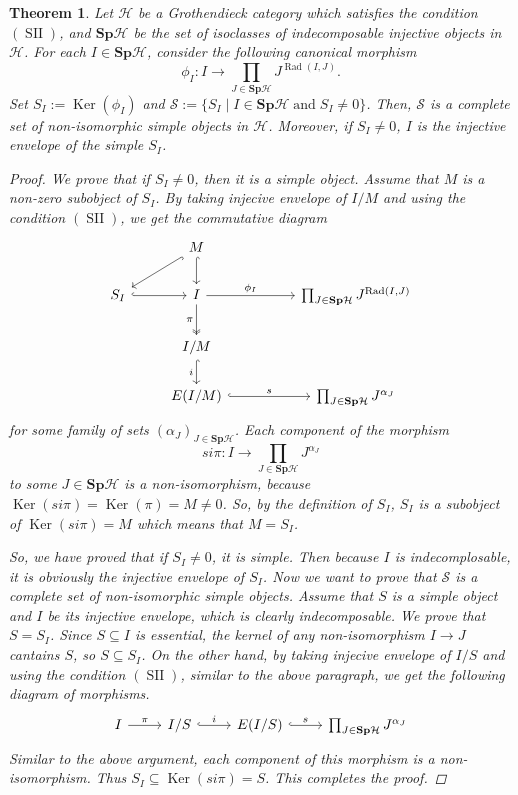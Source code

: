 \documentclass[12pt]{amsart}
\numberwithin{equation}{section}
\newtheorem{theorem}[lemma]{Theorem}
\theoremstyle{definition}
\DeclareMathOperator{\Ker}{Ker}
\DeclareMathOperator{\SII}{SII}
\DeclareMathOperator{\Rad}{Rad}
\newtheorem*{theorem 0*}{Theorem}
\newtheorem*{theorem a*}{Theorem A}
\newtheorem*{theorem b*}{Theorem B}
\newcounter{diagram}
\numberwithin{diagram}{section}
\begin{document}
\begin{theorem}\label{3.4}
Let $\mathcal{H}$ be a Grothendieck category which satisfies the condition $(\SII)$, and $\textbf{Sp}\mathcal{H}$ be the set of isoclasses of indecomposable injective objects in $\mathcal{H}$. For each $I\in\textbf{Sp}\mathcal{H}$, consider the following canonical morphism 
			\[\phi_I:I\longrightarrow \prod_{J\in\textbf{Sp}\mathcal{H}}J^{\Rad(I,J)}.\]
Set $S_I:=\Ker(\phi_I)$ and $\mathcal{S}:=\{S_I\mid I\in\textbf{Sp}\mathcal{H}\; \text{and}\; S_I\neq 0\}$.
Then, $\mathcal{S}$ is a complete set of non-isomorphic simple objects in $\mathcal{H}$. Moreover, if $S_I\neq 0$, $I$ is the injective envelope of the simple $S_I$.
\begin{proof}
We prove that if $S_I\neq 0$, then it is a simple object. Assume that $M$ is a non-zero subobject of $S_I$. By taking injecive envelope of $I/M$ and using the condition $(\SII)$, we get the commutative diagram
	\[\begin{tikzcd}
	& M && \\
	{S_I} & I && {\prod_{J\in\textbf{Sp}\mathcal{H}}J^{\Rad(I,J)}} \\
	{} & {I/M} \\
	& {E(I/M)} && {\prod_{J\in\textbf{Sp}\mathcal{H}}J^{\alpha_J}}
	\arrow[hook, from=1-2, to=2-1]
	\arrow[hook, from=1-2, to=2-2]
	\arrow[hook, from=2-1, to=2-2]
	\arrow["{\phi_I}", from=2-2, to=2-4]
	\arrow["\pi"', two heads, from=2-2, to=3-2]
	\arrow["i"', hook, from=3-2, to=4-2]
	\arrow["s", hook, from=4-2, to=4-4]
\end{tikzcd}\]
for some family of sets $(\alpha_J)_{J\in\textbf{Sp}\mathcal{H}}$. Each component of the morphism 
\[si\pi:I\longrightarrow \prod_{J\in\textbf{Sp}\mathcal{H}}J^{\alpha_J}\]
to some $J\in \textbf{Sp}\mathcal{H}$ is a non-isomorphism, because $\Ker(si\pi)=\Ker(\pi)=M\neq 0$. So, by the definition of $S_I$, $S_I$ is a subobject of $\Ker(si\pi)=M$ which means that $M=S_I$.

So, we have proved that if $S_I\neq 0$, it is simple. Then because $I$ is indecomplosable, it is obviously the injective envelope of $S_I$. Now we want to prove that $\mathcal{S}$ is a complete set of non-isomorphic simple objects. Assume that $S$ is a simple object and $I$ be its injective envelope, which is clearly indecomposable. We prove that $S=S_I$. Since $S\subseteq I$ is essential, the kernel of any non-isomorphism $I\rightarrow J$ cantains $S$, so $S\subseteq S_I$. On the other hand, by taking injecive envelope of $I/S$ and using the condition $(\SII)$, similar to the above paragraph, we get the following diagram of morphisms.
\[\begin{tikzcd}
	I & {I/S} & {E(I/S)} & {\prod_{J\in\textbf{Sp}\mathcal{H}}J^{\alpha_J}}
	\arrow["\pi", from=1-1, to=1-2]
	\arrow["i", hook, from=1-2, to=1-3]
	\arrow["s", hook, from=1-3, to=1-4]
\end{tikzcd}\]
Similar to the above argument, each component of this morphism is a non-isomorphism. Thus $S_I\subseteq\Ker(si\pi)=S$. This completes the proof.
	\end{proof}
	\end{theorem}
	
\end{document}
